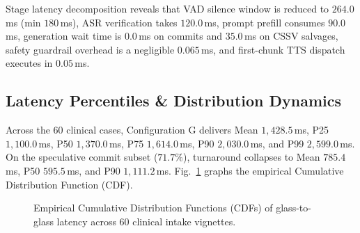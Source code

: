 \documentclass[10pt,journal,compsoc]{IEEEtran}
\begin{document}
Stage latency decomposition reveals that VAD silence window is reduced to $264.0$\,ms (min $180$\,ms), ASR verification takes $120.0$\,ms, prompt prefill consumes $90.0$\,ms, generation wait time is $0.0$\,ms on commits and $35.0$\,ms on CSSV salvages, safety guardrail overhead is a negligible $0.065$\,ms, and first-chunk TTS dispatch
executes in $0.05$\,ms.

\subsection{Latency Percentiles \& Distribution Dynamics}
Across the 60 clinical cases, Configuration G delivers Mean $1{,}428.5$\,ms, P25 $1{,}100.0$\,ms, P50 $1{,}370.0$\,ms, P75 $1{,}614.0$\,ms, P90 $2{,}030.0$\,ms, and P99 $2{,}599.0$\,ms. On the speculative commit subset ($71.7\%$), turnaround collapses to Mean $785.4$\,ms, P50 $\mathbf{595.5}$\,ms, and P90 $1{,}111.2$\,ms.
Fig.~\ref{fig:latency_cdf} graphs the empirical Cumulative Distribution Function (CDF).

\begin{figure}[!t]
\centering
{}
\caption{Empirical Cumulative Distribution Functions (CDFs) of glass-to-glass latency across 60 clinical intake vignettes.}
\label{fig:latency_cdf}
\end{figure}
\end{document}
